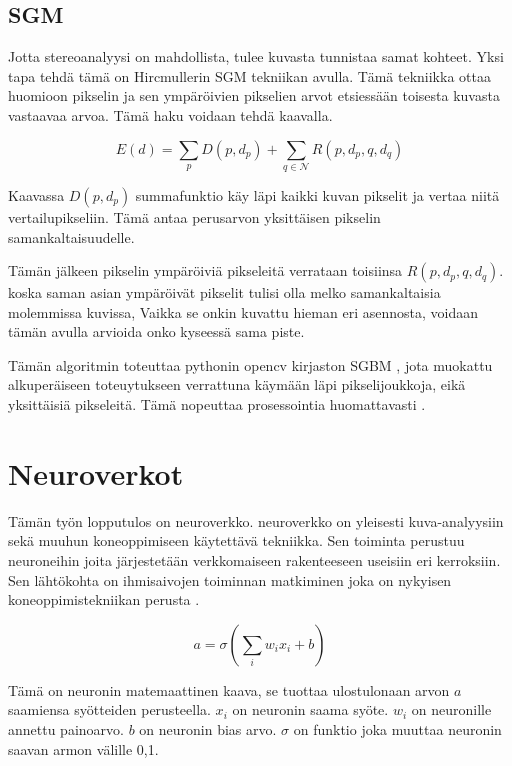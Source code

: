 \subsection{SGM}

Jotta stereoanalyysi on mahdollista,
tulee kuvasta tunnistaa samat kohteet.
Yksi tapa tehdä tämä on Hircmullerin SGM tekniikan avulla\cite{hirschmuller2005babel}.
Tämä tekniikka ottaa huomioon pikselin ja sen ympäröivien pikselien arvot etsiessään toisesta kuvasta vastaavaa arvoa. Tämä haku voidaan tehdä kaavalla.

\begin{equation}\label{yht:SGM}
    E(d) = \sum_{p} D(p, d_p) + \sum_{q \in \mathcal{N}} R(p, d_p, q, d_q)
\end{equation}

Kaavassa \(D(p, d_p)\) summafunktio käy läpi kaikki kuvan pikselit ja vertaa niitä vertailupikseliin.
Tämä antaa perusarvon yksittäisen pikselin samankaltaisuudelle.

Tämän jälkeen pikselin ympäröiviä pikseleitä verrataan toisiinsa \(R(p, d_p, q, d_q)\).
koska saman asian ympäröivät pikselit tulisi olla melko samankaltaisia molemmissa kuvissa, 
Vaikka se onkin kuvattu hieman eri asennosta, voidaan tämän avulla arvioida onko kyseessä sama piste.

Tämän algoritmin toteuttaa pythonin opencv kirjaston SGBM \cite{opencvsgbm},
jota muokattu alkuperäiseen toteuytukseen verrattuna käymään läpi pikselijoukkoja, eikä yksittäisiä pikseleitä.
Tämä nopeuttaa prosessointia huomattavasti \cite{MemoryEfficientSGM}.

\section{Neuroverkot} 

Tämän työn lopputulos on neuroverkko.
neuroverkko on yleisesti kuva-analyysiin sekä muuhun koneoppimiseen käytettävä tekniikka.
Sen toiminta perustuu neuroneihin joita järjestetään verkkomaiseen rakenteeseen useisiin eri kerroksiin.
Sen lähtökohta on ihmisaivojen toiminnan matkiminen joka on nykyisen koneoppimistekniikan perusta \cite{PhamTrungQuang2023EotH}.


\begin{equation}\label{yht:neuroni}
    a = \sigma\left(\sum_i w_i x_i + b\right)
\end{equation}

Tämä on neuronin matemaattinen kaava,
se tuottaa ulostulonaan arvon \(a\) saamiensa syötteiden perusteella.
\(x_i\) on neuronin saama syöte.
\(w_i\) on neuronille annettu painoarvo.
\(b\) on neuronin bias arvo. \(\sigma\) on funktio joka muuttaa neuronin saavan armon välille 0,1.


